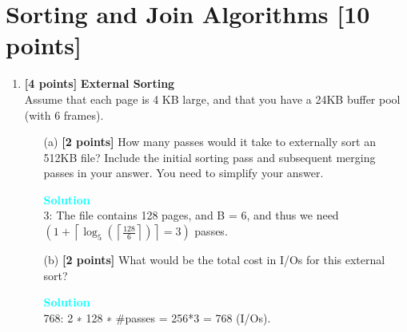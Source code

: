 \documentclass[10pt]{article}
\newenvironment{solution}
    { \begin{mdframed}[backgroundcolor=gray!10] \textcolor{cyan}{\textbf{Solution}} \\}
    {  \end{mdframed}}
\begin{document}
\section{Sorting and Join Algorithms \textbf{[10 points]}}
\begin{enumerate}

	\item \textbf{[4 points]}  \textbf{External Sorting} \\
	      Assume that each page is 4 KB large, and that you have a 24KB buffer pool (with 6 frames).
	      \begin{itemize}
		      \item[(a)] \textbf{[2 points]} How many passes would it take to externally sort an 512KB file?
		            Include the initial sorting pass and subsequent merging passes in your answer. You need to simplify your answer.
		            \begin{solution}
			            3: The file contains 128 pages, and B = 6, and thus we need
			            $\left(1+\left\lceil\log _{5}\left(\left\lceil\frac{128}{6}\right\rceil\right)\right\rceil=3\right)$ passes.
		            \end{solution}
		      \item[(b)] \textbf{[2 points]} What would be the total cost in I/Os for this external sort?
		            \begin{solution}
			            768: 2 ∗ 128 ∗ $\#$passes = 256*3 = 768 (I/Os).
		            \end{solution}
	      \end{itemize}



\end{enumerate}
\end{document}

